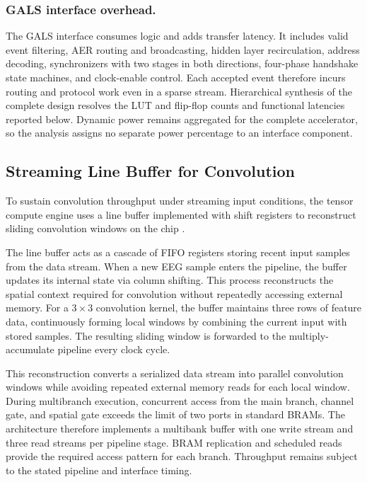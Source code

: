 \documentclass[12pt]{article}
\providecommand{\DIFaddtex}[1]{{\protect\color{blue}\sf #1}}
\providecommand{\DIFadd}[1]{\texorpdfstring{\DIFaddtex{#1}}{#1}}
\providecommand{\DIFaddbegin}{}
\providecommand{\DIFaddend}{}
\begin{document}
\subsubsection*{\DIFadd{GALS interface overhead.}}
\DIFadd{The GALS interface consumes logic and adds transfer latency. It includes valid event filtering, AER routing and broadcasting, hidden layer recirculation, address decoding, synchronizers with two stages in both directions, four-phase handshake state machines, and clock-enable control. Each accepted event therefore incurs routing and protocol work even in a sparse stream. Hierarchical synthesis of the complete design resolves the LUT and flip-flop counts and functional latencies reported below. Dynamic power remains aggregated for the complete accelerator, so the analysis assigns no separate power percentage to an interface component.
}

\DIFaddend \subsection{Streaming Line Buffer for Convolution}
To sustain  \DIFaddbegin \DIFadd{convolution throughput }\DIFaddend under streaming input conditions, the tensor compute engine uses a line buffer  \DIFaddbegin \DIFadd{implemented with }\DIFaddend shift registers to reconstruct sliding convolution windows  \DIFaddbegin \DIFadd{on the chip }\DIFaddend \cite{conv}.

The line buffer acts as a cascade of FIFO registers storing recent input samples from the data stream. When a new EEG sample enters the pipeline, the buffer updates its internal state via column shifting. This process reconstructs the spatial context required for convolution without repeatedly accessing external memory. For a $3\times3$ convolution kernel, the buffer maintains three rows of feature data, continuously forming local windows by combining the current input with stored samples. The resulting sliding window is forwarded to the multiply-accumulate pipeline every clock cycle.

This reconstruction converts a serialized data stream into parallel convolution windows  \DIFaddbegin \DIFadd{while avoiding repeated external memory reads for each local window}\DIFaddend . During multibranch execution, concurrent access from the main branch, channel gate, and spatial gate exceeds the  \DIFaddbegin \DIFadd{limit of two ports in standard BRAMs}\DIFaddend . The architecture therefore implements a multibank buffer  \DIFaddbegin \DIFadd{with }\DIFaddend one write stream and three read streams per pipeline stage.  \DIFaddbegin \DIFadd{BRAM }\DIFaddend replication and scheduled reads  \DIFaddbegin \DIFadd{provide the required access pattern for each branch. Throughput remains subject to the stated pipeline and interface timing}\DIFaddend .
\end{document}
